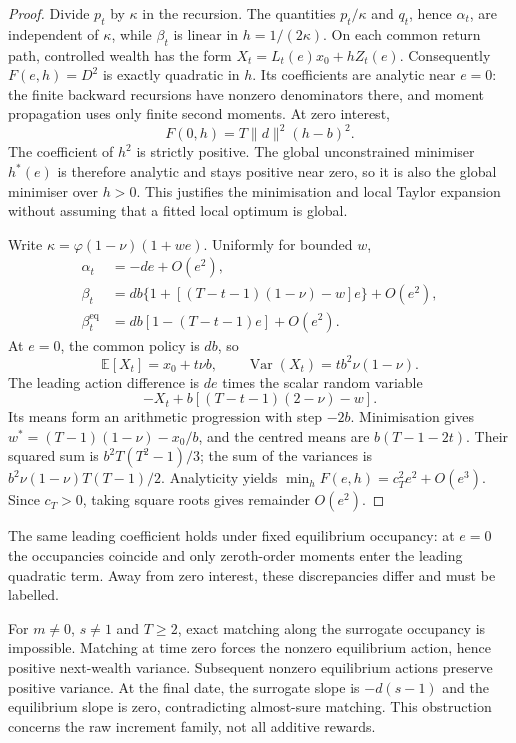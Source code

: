 \documentclass[11pt,a4paper]{article}
\theoremstyle{plain}
\theoremstyle{definition}
\theoremstyle{remark}
\newcommand{\E}{\mathbb{E}}
\newcommand{\Var}{\operatorname{Var}}
\begin{document}
\begin{proof}
Divide $p_t$ by $\kappa$ in the recursion. The quantities $p_t/\kappa$ and
$q_t$, hence $\alpha_t$, are independent of $\kappa$, while $\beta_t$ is linear
in $h=1/(2\kappa)$. On each common return path, controlled wealth has the form
$X_t=L_t(e)x_0+hZ_t(e)$. Consequently $F(e,h)=D^2$ is exactly quadratic in $h$.
Its coefficients are analytic near $e=0$: the finite backward recursions have
nonzero denominators there, and moment propagation uses only finite second moments.
At zero interest,
\[
 F(0,h)=T\|d\|^2(h-b)^2.
\]
The coefficient of $h^2$ is strictly positive. The global unconstrained minimiser
$h^*(e)$ is therefore analytic and stays positive near zero, so it is also the
global minimiser over $h>0$. This justifies the minimisation and local Taylor
expansion without assuming that a fitted local optimum is global.

Write $\kappa=\varphi(1-\nu)(1+we)$. Uniformly for bounded $w$,
\begin{align*}
 \alpha_t&=-de+O(e^2),\\
 \beta_t&=db\{1+[(T-t-1)(1-\nu)-w]e\}+O(e^2),\\
 \beta_t^{\mathrm{eq}}&=db[1-(T-t-1)e]+O(e^2).
\end{align*}
At $e=0$, the common policy is $db$, so
\[
 \E[X_t]=x_0+t\nu b,\qquad
 \Var(X_t)=tb^2\nu(1-\nu).
\]
The leading action difference is $de$ times the scalar random variable
\[
 -X_t+b[(T-t-1)(2-\nu)-w].
\]
Its means form an arithmetic progression with step $-2b$. Minimisation gives
$w^*=(T-1)(1-\nu)-x_0/b$, and the centred means are $b(T-1-2t)$.
Their squared sum is $b^2T(T^2-1)/3$; the sum of the variances is
$b^2\nu(1-\nu)T(T-1)/2$. Analyticity yields
$\min_hF(e,h)=c_T^2e^2+O(e^3)$. Since $c_T>0$, taking square roots gives
remainder $O(e^2)$.
\end{proof}

The same leading coefficient holds under fixed equilibrium occupancy: at
$e=0$ the occupancies coincide and only zeroth-order moments enter the leading
quadratic term. Away from zero interest, these discrepancies differ and must be labelled.

For $m\ne0$, $s\ne1$ and $T\ge2$, exact matching along the surrogate occupancy
is impossible. Matching at time zero forces the nonzero equilibrium action,
hence positive next-wealth variance. Subsequent nonzero equilibrium actions
preserve positive variance. At the final date, the surrogate slope is $-d(s-1)$
and the equilibrium slope is zero, contradicting almost-sure matching.
This obstruction concerns the raw increment family, not all additive rewards.
\end{document}
